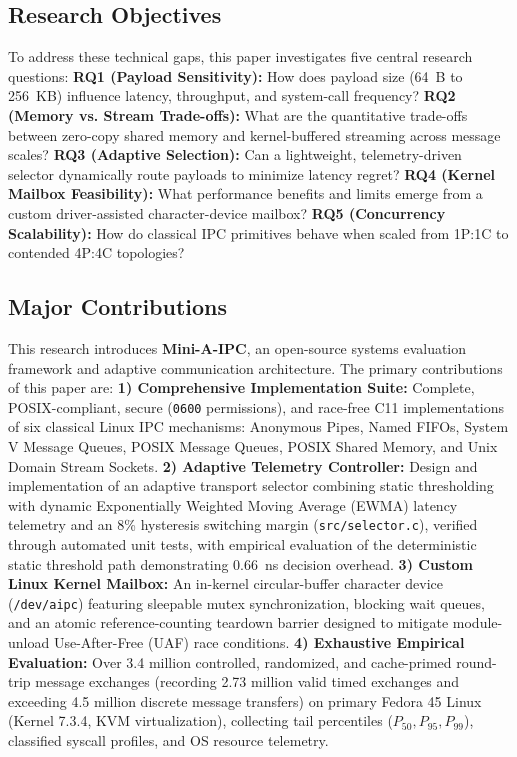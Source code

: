 \subsection{Research Objectives}
To address these technical gaps, this paper investigates five central research questions:
\textbf{RQ1 (Payload Sensitivity):} How does payload size (64~B to 256~KB) influence latency, throughput, and system-call frequency?
\textbf{RQ2 (Memory vs. Stream Trade-offs):} What are the quantitative trade-offs between zero-copy shared memory and kernel-buffered streaming across message scales?
\textbf{RQ3 (Adaptive Selection):} Can a lightweight, telemetry-driven selector dynamically route payloads to minimize latency regret?
\textbf{RQ4 (Kernel Mailbox Feasibility):} What performance benefits and limits emerge from a custom driver-assisted character-device mailbox?
\textbf{RQ5 (Concurrency Scalability):} How do classical IPC primitives behave when scaled from 1P:1C to contended 4P:4C topologies?

\subsection{Major Contributions}
This research introduces \textbf{Mini-A-IPC}, an open-source systems evaluation framework and adaptive communication architecture. The primary contributions of this paper are:
\textbf{1) Comprehensive Implementation Suite:} Complete, POSIX-compliant, secure (\texttt{0600} permissions), and race-free C11 implementations of six classical Linux IPC mechanisms: Anonymous Pipes, Named FIFOs, System V Message Queues, POSIX Message Queues, POSIX Shared Memory, and Unix Domain Stream Sockets.
\textbf{2) Adaptive Telemetry Controller:} Design and implementation of an adaptive transport selector combining static thresholding with dynamic Exponentially Weighted Moving Average (EWMA) latency telemetry and an 8\% hysteresis switching margin (\texttt{src/selector.c}), verified through automated unit tests, with empirical evaluation of the deterministic static threshold path demonstrating 0.66~ns decision overhead.
\textbf{3) Custom Linux Kernel Mailbox:} An in-kernel circular-buffer character device (\texttt{/dev/aipc}) featuring sleepable mutex synchronization, blocking wait queues, and an atomic reference-counting teardown barrier designed to mitigate module-unload Use-After-Free (UAF) race conditions.
\textbf{4) Exhaustive Empirical Evaluation:} Over 3.4 million controlled, randomized, and cache-primed round-trip message exchanges (recording 2.73 million valid timed exchanges and exceeding 4.5 million discrete message transfers) on primary Fedora 45 Linux (Kernel 7.3.4, KVM virtualization), collecting tail percentiles ($P_{50}, P_{95}, P_{99}$), classified syscall profiles, and OS resource telemetry.

